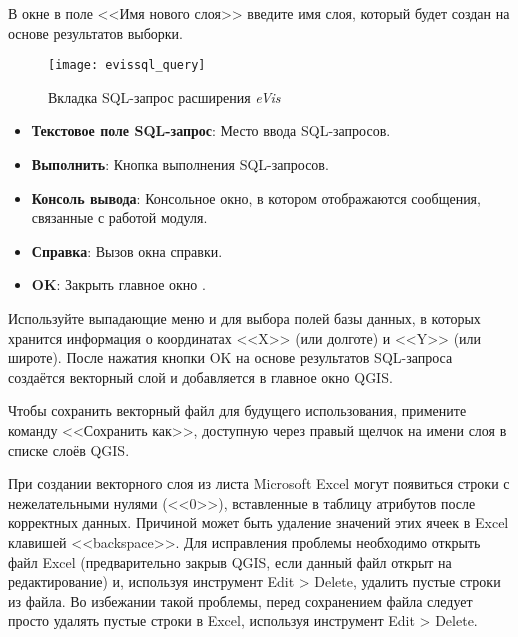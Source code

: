 В окне  в поле <<Имя нового слоя>> введите имя слоя,
который будет создан на основе результатов выборки.

\begin{figure}[ht]
   \centering
   \texttt{[image: evissql\_query]}
   \caption{\label{evissql_query}Вкладка SQL-запрос расширения \emph{eVis}
   \wincaption}
\end{figure}

\begin{itemize}[label=--]
\item \textbf{Текстовое поле SQL-запрос}: Место ввода SQL-запросов.
\item \textbf{Выполнить}: Кнопка выполнения SQL-запросов.
\item \textbf{Консоль вывода}: Консольное окно, в котором отображаются
сообщения, связанные с работой модуля.
\item \textbf{Справка}: Вызов окна справки.
\item \textbf{OK}: Закрыть главное окно .
\end{itemize}

Используйте выпадающие меню  и
 для выбора полей базы данных, в которых хранится
информация о координатах <<X>> (или долготе) и <<Y>> (или широте). После
нажатия кнопки OK на основе результатов SQL-запроса создаётся векторный
слой и добавляется в главное окно QGIS.

Чтобы сохранить векторный файл для будущего использования, примените
команду <<Сохранить как>>, доступную через правый щелчок на имени слоя в
списке слоёв QGIS.

\begin{Tip}\caption{\textsc{Создание векторного слоя на основе данных
листа Microsoft Excel}} При создании векторного слоя из листа Microsoft
Excel могут появиться строки с нежелательными нулями (<<0>>), вставленные
в таблицу атрибутов после корректных данных. Причиной может быть удаление
значений этих ячеек в Excel клавишей <<backspace>>. Для исправления проблемы
необходимо открыть файл Excel (предварительно закрыв QGIS, если данный файл
открыт на редактирование) и, используя инструмент Edit > Delete, удалить
пустые строки из файла. Во избежании такой проблемы, перед сохранением
файла следует просто удалять пустые строки в Excel, используя инструмент
Edit > Delete.
\end{Tip}

\label{evis_predefined}


